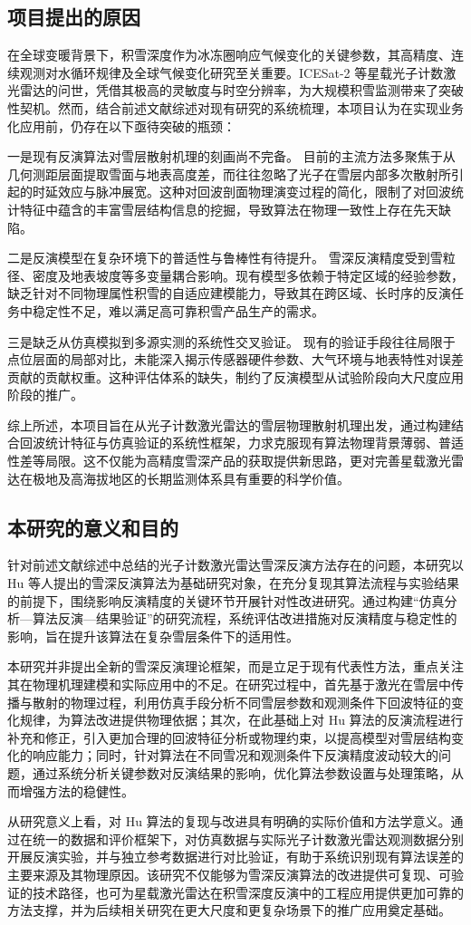 \subsection{项目提出的原因}
在全球变暖背景下，积雪深度作为冰冻圈响应气候变化的关键参数，其高精度、连续观测对水循环规律及全球气候变化研究至关重要。ICESat-2 等星载光子计数激光雷达的问世，凭借其极高的灵敏度与时空分辨率，为大规模积雪监测带来了突破性契机。然而，结合前述文献综述对现有研究的系统梳理，本项目认为在实现业务化应用前，仍存在以下亟待突破的瓶颈：

一是现有反演算法对雪层散射机理的刻画尚不完备。 目前的主流方法多聚焦于从几何测距层面提取雪面与地表高度差，而往往忽略了光子在雪层内部多次散射所引起的时延效应与脉冲展宽。这种对回波剖面物理演变过程的简化，限制了对回波统计特征中蕴含的丰富雪层结构信息的挖掘，导致算法在物理一致性上存在先天缺陷。

二是反演模型在复杂环境下的普适性与鲁棒性有待提升。 雪深反演精度受到雪粒径、密度及地表坡度等多变量耦合影响。现有模型多依赖于特定区域的经验参数，缺乏针对不同物理属性积雪的自适应建模能力，导致其在跨区域、长时序的反演任务中稳定性不足，难以满足高可靠积雪产品生产的需求。

三是缺乏从仿真模拟到多源实测的系统性交叉验证。 现有的验证手段往往局限于点位层面的局部对比，未能深入揭示传感器硬件参数、大气环境与地表特性对误差贡献的贡献权重。这种评估体系的缺失，制约了反演模型从试验阶段向大尺度应用阶段的推广。

综上所述，本项目旨在从光子计数激光雷达的雪层物理散射机理出发，通过构建结合回波统计特征与仿真验证的系统性框架，力求克服现有算法物理背景薄弱、普适性差等局限。这不仅能为高精度雪深产品的获取提供新思路，更对完善星载激光雷达在极地及高海拔地区的长期监测体系具有重要的科学价值。

\subsection{本研究的意义和目的}
针对前述文献综述中总结的光子计数激光雷达雪深反演方法存在的问题，本研究以 Hu\citep{Hu2022} 等人提出的雪深反演算法为基础研究对象，在充分复现其算法流程与实验结果的前提下，围绕影响反演精度的关键环节开展针对性改进研究。通过构建“仿真分析—算法反演—结果验证”的研究流程，系统评估改进措施对反演精度与稳定性的影响，旨在提升该算法在复杂雪层条件下的适用性。

本研究并非提出全新的雪深反演理论框架，而是立足于现有代表性方法，重点关注其在物理机理建模和实际应用中的不足。在研究过程中，首先基于激光在雪层中传播与散射的物理过程，利用仿真手段分析不同雪层参数和观测条件下回波特征的变化规律，为算法改进提供物理依据；其次，在此基础上对 Hu 算法的反演流程进行补充和修正，引入更加合理的回波特征分析或物理约束，以提高模型对雪层结构变化的响应能力；同时，针对算法在不同雪况和观测条件下反演精度波动较大的问题，通过系统分析关键参数对反演结果的影响，优化算法参数设置与处理策略，从而增强方法的稳健性。

从研究意义上看，对 Hu 算法的复现与改进具有明确的实际价值和方法学意义。通过在统一的数据和评价框架下，对仿真数据与实际光子计数激光雷达观测数据分别开展反演实验，并与独立参考数据进行对比验证，有助于系统识别现有算法误差的主要来源及其物理原因。该研究不仅能够为雪深反演算法的改进提供可复现、可验证的技术路径，也可为星载激光雷达在积雪深度反演中的工程应用提供更加可靠的方法支撑，并为后续相关研究在更大尺度和更复杂场景下的推广应用奠定基础。
